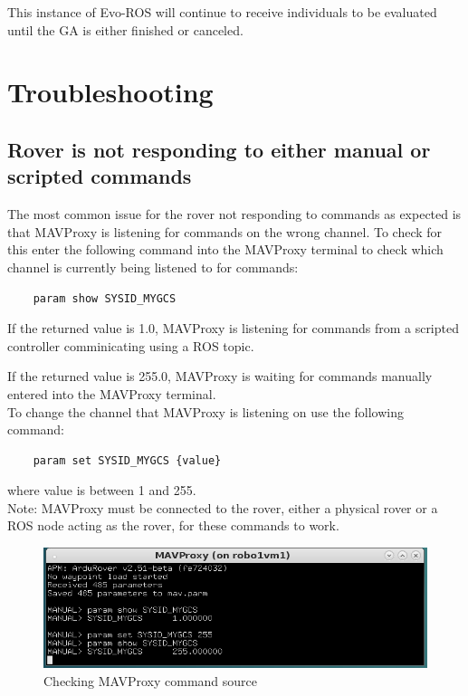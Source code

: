 \documentclass{report}
\begin{document}
This instance of Evo-ROS will continue to receive individuals to be evaluated until the GA is either finished or canceled. 
	



\chapter{Troubleshooting}
\section{Rover is not responding to either manual or scripted commands}\label{changeMAVcommandSource}
The most common issue for the rover not responding to commands as expected is that MAVProxy is listening for commands on the wrong channel. To check for this enter the following command into the MAVProxy terminal to check which channel is currently being listened to for commands:
\begin{lstlisting}
	param show SYSID_MYGCS
\end{lstlisting}

If the returned value is 1.0, MAVProxy is listening for commands from a scripted controller comminicating using a ROS topic.

If the returned value is 255.0, MAVProxy is waiting for commands manually entered into the MAVProxy terminal. \\

To change the channel that MAVProxy is listening on use the following command:

\begin{lstlisting}
	param set SYSID_MYGCS {value}
\end{lstlisting}

where value is between 1 and 255.\\

Note: MAVProxy must be connected to the rover, either a physical rover or a ROS node acting as the rover, for these commands to work.

\begin{figure}[ht]
	\centering
	\includegraphics{Images/MAVcommandSourse}
	\caption{Checking MAVProxy command source}
\end{figure}
\end{document}
